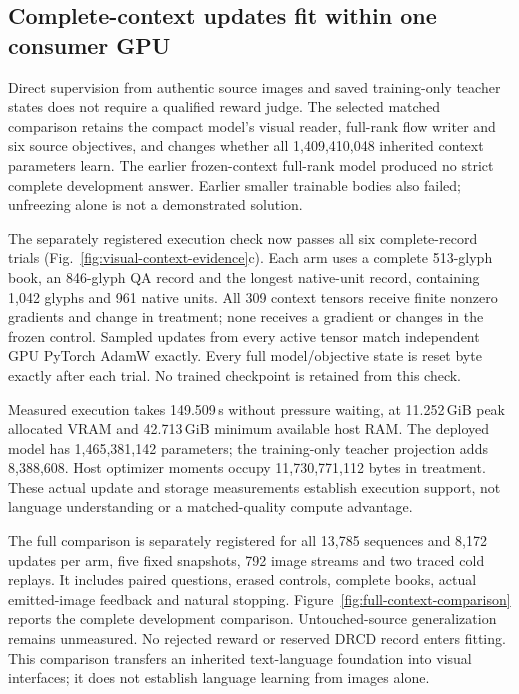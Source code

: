 \documentclass[12pt,a4paper]{article}
\providecommand{\DIFadd}[1]{{\protect\color{blue} \sf #1}} %
\begin{document}
\subsection*{\DIFadd{Complete-context updates fit within one consumer GPU}}

\DIFadd{Direct supervision from authentic source images and saved training-only teacher
states does not require a qualified reward judge. The selected matched
comparison retains the compact model's visual reader, full-rank flow writer and
six source objectives, and changes whether all 1,409,410,048 inherited context
parameters learn. The earlier frozen-context full-rank model produced no strict
complete development answer. Earlier smaller trainable bodies also failed;
unfreezing alone is not a demonstrated solution.
}

\DIFadd{The separately registered execution check now passes all six complete-record
trials (Fig.~\ref{fig:visual-context-evidence}c). Each arm uses a complete
513-glyph book, an 846-glyph QA record and the longest native-unit record,
containing 1,042 glyphs and 961 native units. All 309 context tensors receive
finite nonzero gradients and change in treatment; none receives a gradient or
changes in the frozen control. Sampled updates from every active tensor match
independent GPU PyTorch AdamW exactly. Every full model/objective state is reset
byte exactly after each trial. No trained checkpoint is retained from this check.
}

\DIFadd{Measured execution takes 149.509\,s without pressure waiting, at 11.252\,GiB peak
allocated VRAM and 42.713\,GiB minimum available host RAM. The deployed model has
1,465,381,142 parameters; the training-only teacher projection adds 8,388,608.
Host optimizer moments occupy 11,730,771,112 bytes in treatment. These actual
update and storage measurements establish execution support, not language
understanding or a matched-quality compute advantage.
}

\DIFadd{The full comparison is separately registered for all 13,785 sequences and
8,172 updates per arm, five fixed snapshots, 792 image streams and two traced
cold replays. It includes paired questions, erased controls, complete books,
actual emitted-image feedback and natural stopping. Figure~\ref{fig:full-context-comparison} reports the complete development
comparison. Untouched-source generalization remains unmeasured. No rejected
reward or reserved DRCD record enters fitting. This comparison transfers an
inherited text-language foundation into visual interfaces; it does not establish
language learning from images alone.
}
\end{document}
